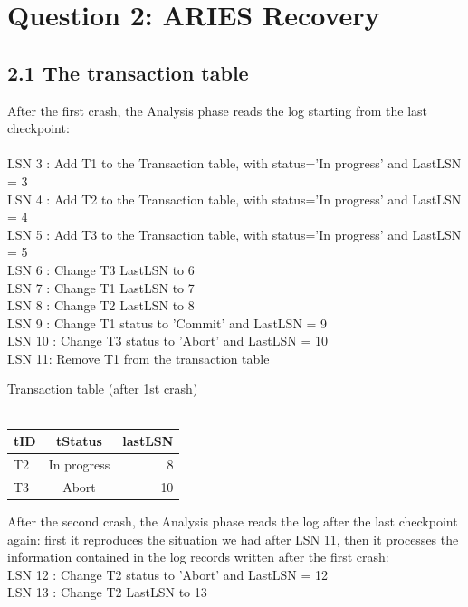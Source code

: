 \documentclass[paper=a4, fontsize=11pt]{scrartcl} %
\numberwithin{equation}{section} %
\numberwithin{figure}{section} %
\numberwithin{table}{section} %
\begin{document}
\section{Question 2: ARIES Recovery}

\subsection{2.1 The transaction table}

After the first crash, the Analysis phase reads the log starting from the last checkpoint:\\
~\\
LSN 3 : Add T1 to the Transaction table, with status='In progress' and LastLSN = 3\\
LSN 4 : Add T2 to the Transaction table, with status='In progress' and LastLSN = 4\\
LSN 5 : Add T3 to the Transaction table, with status='In progress' and LastLSN = 5\\
LSN 6 : Change T3 LastLSN to 6\\
LSN 7 : Change T1 LastLSN to 7\\
LSN 8 : Change T2 LastLSN to 8\\
LSN 9 : Change T1 status to 'Commit' and LastLSN = 9\\
LSN 10 : Change T3 status to 'Abort' and LastLSN = 10\\
LSN 11: Remove T1 from the transaction table\\

\begin{center}
  Transaction table (after 1st crash)\\~\\
  \begin{tabular}{ l | c | r }
    \hline
    \textbf{tID} & \textbf{tStatus} & \textbf{lastLSN} \\ \hline
    T2 & In progress & 8 \\ \hline
    T3 & Abort & 10 \\
    \hline
  \end{tabular}
\end{center}

After the second crash, the Analysis phase reads the log after the last checkpoint again: first it reproduces the situation we had after LSN 11, then it processes the information contained in the log records written after the first crash:\\
LSN 12 : Change T2 status to 'Abort' and LastLSN = 12\\
LSN 13 : Change T2 LastLSN to 13\\
\end{document}
